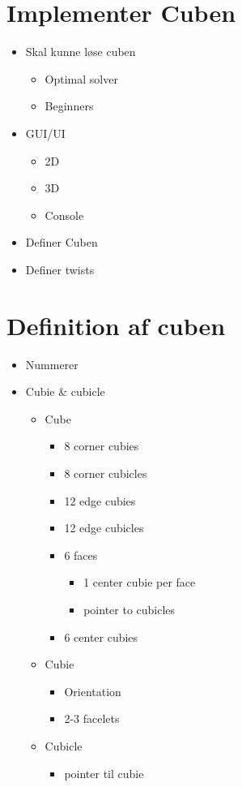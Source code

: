 \documentclass{article}
\begin{document}
\section{Implementer Cuben}

\begin{itemize}
	\item Skal kunne l\o{}se cuben
	\begin{itemize}
		\item Optimal solver
		\item Beginners
	\end{itemize}
	\item GUI/UI
	\begin{itemize}
		\item 2D
		\item 3D
		\item Console
	\end{itemize}
	\item Definer Cuben
	\item Definer twists
\end{itemize}

\section{Definition af cuben}

\begin{itemize}
	\item Nummerer
	\item Cubie \& cubicle
	\begin{itemize}
		\item Cube
		\begin{itemize}
			\item 8 corner cubies
			\item 8 corner cubicles
			\item 12 edge cubies
			\item 12 edge cubicles
			\item 6 faces
			\begin{itemize}
				\item 1 center cubie per face
				\item pointer to cubicles
			\end{itemize}
			\item 6 center cubies
		\end{itemize}
		\item Cubie
		\begin{itemize}
			\item Orientation
			\item 2-3 facelets
		\end{itemize}
		\item Cubicle
		\begin{itemize}
			\item pointer til cubie
		\end{itemize}
	\end{itemize}
\end{itemize}
\end{document}
